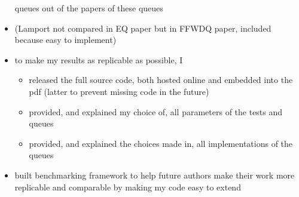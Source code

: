 \begin{itemize}
        queues out of the papers of these queues
    \item (Lamport not compared in EQ paper but in FFWDQ paper, included because easy to implement)
    \item to make my results as replicable as possible, I
        \begin{itemize}
            \item released the full source code, both hosted online and embedded into the pdf
                (latter to prevent missing code in the future)
            \item provided, and explained my choice of, all parameters of the tests and queues
            \item provided, and explained the choices made in, all implementations of the queues
        \end{itemize}
    \item built benchmarking framework to help future authors make their work more replicable and comparable
        by making my code easy to extend
\end{itemize}
